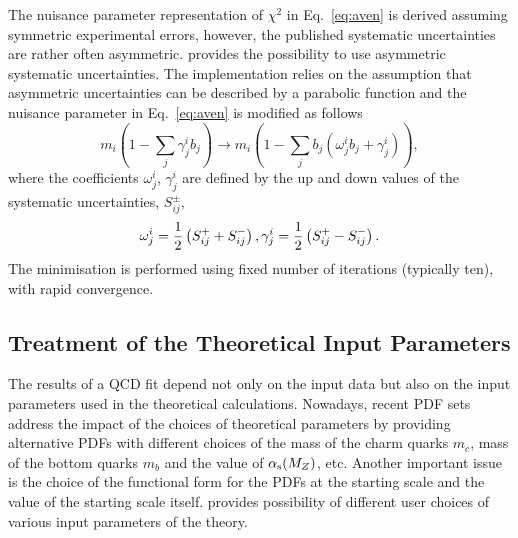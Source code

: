 %
The nuisance parameter representation of $\chi^2$ in Eq.~\ref{eq:aven} is derived assuming 
symmetric experimental errors, however, the published systematic uncertainties are 
rather often asymmetric.
\fitter provides the possibility to use asymmetric systematic uncertainties.
The implementation relies on the assumption that 
asymmetric uncertainties can be described by a parabolic function
and the nuisance parameter in Eq.~\ref{eq:aven} is modified as follows
\begin{equation}
  m_i(1-\sum_j \gamma^i_{j} b_j) \to 
m_i\left(1-\sum_j b_j(\omega^i_{j}b_j + \gamma^i_{j})\right),
\end{equation}
where the coefficients $\omega^i_{j}$, $\gamma^i_{j}$ are defined  
by the up and down values of the systematic uncertainties,
$S_{ij}^{\pm}$,
\begin{equation}
  \omega^i_{j}=\frac{1}{2}\left(S_{ij}^{+}+S_{ij}^{-}\right), \\
  \gamma^i_{j}=\frac{1}{2}\left(S_{ij}^{+}-S_{ij}^{-}\right). 
\end{equation}
The minimisation is performed using fixed number of iterations (typically ten), with rapid convergence.





\subsection{Treatment of the Theoretical Input Parameters}

The results of a QCD fit depend not only on the input data but also on the 
input parameters used in the theoretical calculations. Nowadays, recent PDF sets 
address the impact of the choices of theoretical parameters by providing
alternative PDFs with different choices of the mass of the charm quarks $m_c$, 
mass of the bottom quarks $m_b$ and the value of $\alpha_\mathrm{s}(M_Z)$, etc. 
Another important issue is the choice of the functional form for the PDFs at the 
starting scale and the value of the starting scale itself. \fitter provides 
possibility of different user choices of various input parameters of the theory.

